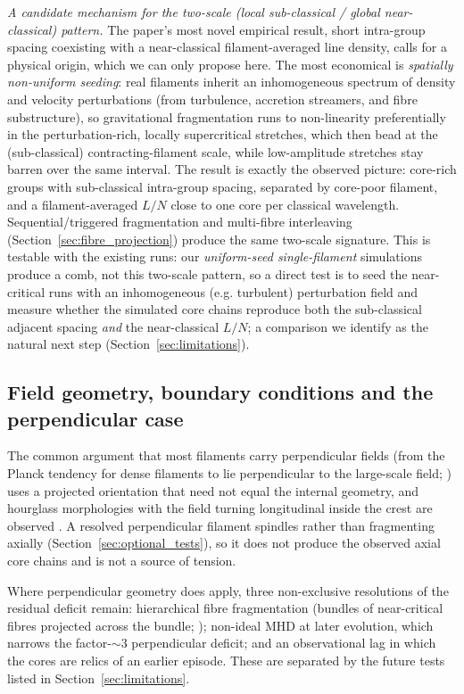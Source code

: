 \documentclass[usenatbib,twoside,twocolumn]{mnras}
\begin{document}
\emph{A candidate mechanism for the two-scale (local sub-classical / global near-classical) pattern.} The paper's most novel empirical result, short intra-group spacing coexisting with a near-classical filament-averaged line density, calls for a physical origin, which we can only propose here. The most economical is \emph{spatially non-uniform seeding}: real filaments inherit an inhomogeneous spectrum of density and velocity perturbations (from turbulence, accretion streamers, and fibre substructure), so gravitational fragmentation runs to non-linearity preferentially in the perturbation-rich, locally supercritical stretches, which then bead at the (sub-classical) contracting-filament scale, while low-amplitude stretches stay barren over the same interval. The result is exactly the observed picture: core-rich groups with sub-classical intra-group spacing, separated by core-poor filament, and a filament-averaged $L/N$ close to one core per classical wavelength. Sequential/triggered fragmentation and multi-fibre interleaving (Section~\ref{sec:fibre_projection}) produce the same two-scale signature. This is testable with the existing runs: our \emph{uniform-seed single-filament} simulations produce a comb, not this two-scale pattern, so a direct test is to seed the near-critical runs with an inhomogeneous (e.g. turbulent) perturbation field and measure whether the simulated core chains reproduce both the sub-classical adjacent spacing \emph{and} the near-classical $L/N$; a comparison we identify as the natural next step (Section~\ref{sec:limitations}).

\subsection{Field geometry, boundary conditions and the perpendicular case}
\label{sec:why_mhd_fails}

The common argument that most filaments carry perpendicular fields (from the Planck tendency for dense filaments to lie perpendicular to the large-scale field; \citealt{Planck2016}) uses a projected orientation that need not equal the internal geometry, and hourglass morphologies with the field turning longitudinal inside the crest are observed \citep{Jadhav2026}. A resolved perpendicular filament spindles rather than fragmenting axially (Section~\ref{sec:optional_tests}), so it does not produce the observed axial core chains and is not a source of tension.

Where perpendicular geometry does apply, three non-exclusive resolutions of the residual deficit remain: hierarchical fibre fragmentation (bundles of near-critical fibres projected across the bundle; \citealt{Hacar2013,Hacar2018,Yang2024}); non-ideal MHD at later evolution, which narrows the factor-$\sim3$ perpendicular deficit; and an observational lag in which the cores are relics of an earlier episode. These are separated by the future tests listed in Section~\ref{sec:limitations}.
\end{document}
